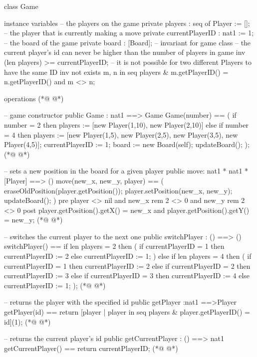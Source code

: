 \begin{vdmpp}[breaklines=true]
class Game

instance variables
 -- the players on the game
 private players : seq of Player := [];
 -- the player that is currently making a move
 private currentPlayerID : nat1 := 1;
 -- the board of the game
 private board : [Board];
 -- invariant for game class
 -- the current player's id can never be higher than the number of players in game
 inv (len players) >= currentPlayerID;
 -- it is not possible for two different Players to have the same ID
 inv not exists m, n in seq players & m.getPlayerID() = n.getPlayerID() and m <> n;

operations
(*@
\label{Game:17}
@*)
 
  -- game constructor
  public Game : nat1 ==> Game
  Game(number) ==
  (
   if number = 2
   then players := [new Player(1,10), new Player(2,10)]
   else if number = 4 
   then players := [new Player(1,5), new Player(2,5), new Player(3,5), new Player(4,5)];
   currentPlayerID := 1;
   board := new Board(self);
   updateBoard();
  );
(*@
\label{move:30}
@*)
  
  -- sets a new position in the board for a given player
  public move: nat1 * nat1 * [Player] ==> ()
  move(new_x, new_y, player) ==
  (
   eraseOldPosition(player.getPosition());
   player.setPosition(new_x, new_y);
   updateBoard();
  )
  pre player <> nil and new_x rem 2 <> 0 and new_y rem 2 <> 0 
  post player.getPosition().getX() = new_x and player.getPosition().getY() = new_y;
(*@
\label{switchPlayer:41}
@*)

  -- switches the current player to the next one
  public switchPlayer : () ==> ()
  switchPlayer() == 
  if len players = 2
  then
  (
   if currentPlayerID = 1 then currentPlayerID := 2 
   else currentPlayerID := 1;
  )
  else if len players = 4
  then
  (
   if currentPlayerID = 1 then currentPlayerID := 2 
   else if currentPlayerID = 2 then currentPlayerID := 3
   else if currentPlayerID = 3 then currentPlayerID := 4 
   else currentPlayerID := 1;
  );
(*@
\label{getPlayer:59}
@*)
  
  -- returns the player with the specified id
  public getPlayer :nat1 ==>Player 
  getPlayer(id) ==
  return [player | player in seq players  &  player.getPlayerID() = id](1);
(*@
\label{getCurrentPlayer:64}
@*)
  
  -- returns the current player's id
  public getCurrentPlayer : () ==> nat1
  getCurrentPlayer() ==
  return currentPlayerID;
(*@
\label{currentPlayerWin:69}
@*)
  

\end{vdmpp}
